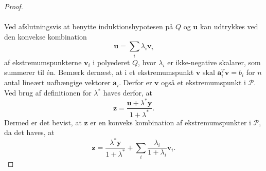 \begin{proof}
\\\\
Ved afslutningsvis at benytte induktionshypotesen på $Q$ og $\textbf{u}$ kan udtrykkes ved den konvekse kombination
$$\textbf{u}=\sum_{i}\lambda_{i}\textbf{v}_i$$
af ekstremumspunkterne $\textbf{v}_i$ i polyederet $Q$, hvor $\lambda_i$ er ikke-negative skalarer, som summerer til én. 
Bemærk dernæst, at i et ekstremumspunkt $\textbf{v}$ skal $\mathbf{a}_{i}^{T} \textbf{v}=b_{i}$ for $n$ antal lineært uafhængige vektorer $\textbf{a}_i$. 
Derfor er  $\textbf{v}$ også et ekstremumspunkt i $\mathcal{P}$. 
Ved brug af definitionen for $\lambda^*$ haves derfor, at 
$$ \textbf{z}=\frac{\textbf{u}+\lambda^*\textbf{y}}{1+\lambda^*}.$$
Dermed er det bevist, at $\textbf{z}$ er en konveks kombination af ekstremumspunkter i $\mathcal{P}$, da det haves, at 
$$\textbf{z}=\frac{\lambda^*\textbf{y}}{1+\lambda^*}+\sum_{i}\frac{\lambda_i}{1+\lambda_i}\textbf{v}_i.$$
\end{proof}
